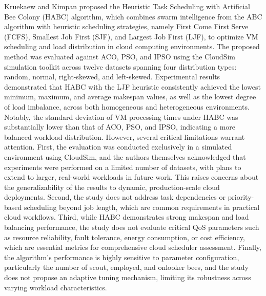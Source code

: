 \documentclass[pdflatex,sn-mathphys-num]{sn-jnl}%
\theoremstyle{thmstyleone}%
\theoremstyle{thmstyletwo}%
\theoremstyle{thmstylethree}%
\begin{document}
Kruekaew and Kimpan \cite{bib12} proposed the Heuristic Task Scheduling with Artificial Bee Colony (HABC) algorithm, which combines swarm intelligence from the ABC algorithm with heuristic scheduling strategies, namely First Come First Serve (FCFS), Smallest Job First (SJF), and Largest Job First (LJF), to optimize VM scheduling and load distribution in cloud computing environments. The proposed method was evaluated against ACO, PSO, and IPSO using the CloudSim simulation toolkit across twelve datasets spanning four distribution types: random, normal, right-skewed, and left-skewed. Experimental results demonstrated that HABC with the LJF heuristic consistently achieved the lowest minimum, maximum, and average makespan values, as well as the lowest degree of load imbalance, across both homogeneous and heterogeneous environments. Notably, the standard deviation of VM processing times under HABC was substantially lower than that of ACO, PSO, and IPSO, indicating a more balanced workload distribution. However, several critical limitations warrant attention. First, the evaluation was conducted exclusively in a simulated environment using CloudSim, and the authors themselves acknowledged that experiments were performed on a limited number of datasets, with plans to extend to larger, real-world workloads in future work. This raises concerns about the generalizability of the results to dynamic, production-scale cloud deployments. Second, the study does not address task dependencies or priority-based scheduling beyond job length, which are common requirements in practical cloud workflows. Third, while HABC demonstrates strong makespan and load balancing performance, the study does not evaluate critical QoS parameters such as resource reliability, fault tolerance, energy consumption, or cost efficiency, which are essential metrics for comprehensive cloud scheduler assessment. Finally, the algorithm's performance is highly sensitive to parameter configuration, particularly the number of scout, employed, and onlooker bees, and the study does not propose an adaptive tuning mechanism, limiting its robustness across varying workload characteristics.
\end{document}
